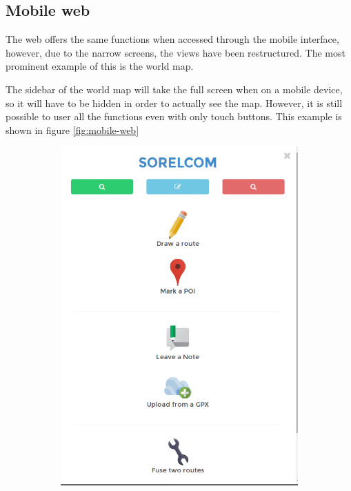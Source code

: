 \subsection{Mobile web}

The web offers the same functions when accessed through the mobile interface, however, due to the narrow screens, the views have been restructured. The most prominent example of this is the world map.

The sidebar of the world map will take the full screen when on a mobile device, so it will have to be hidden in order to actually see the map. However, it is still possible to user all the functions even with only touch buttons. This example is shown in figure \ref{fig:mobile-web}

\begin{figure}[ht]
  \centering
  \begin{subfigure}{.45\textwidth}
    \centering
    \includegraphics[width=.8\textwidth]{fig/responsive1}
  \end{subfigure}
  \begin{subfigure}{.45\textwidth}
    \centering

\end{subfigure}
\end{figure}
